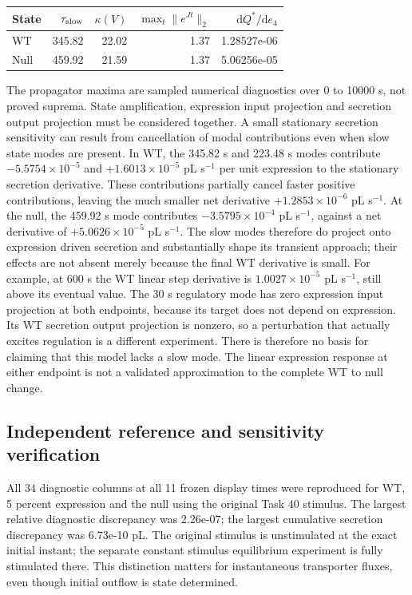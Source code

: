 \begin{center}\begin{tabular}{lrrrr}\hline State & $\tau_{\rm slow}$ & $\kappa(V)$ & $\max_t\|e^{Jt}\|_2$ & $\mathrm{d}Q^*/\mathrm{d}e_4$\\\hline

WT & 345.82 & 22.02 & 1.37 & 1.28527e-06\\

Null & 459.92 & 21.59 & 1.37 & 5.06256e-05\\

\hline\end{tabular}\end{center}

The propagator maxima are sampled numerical diagnostics over 0 to 10000 s, not proved suprema. State amplification, expression input projection and secretion output projection must be considered together. A small stationary secretion sensitivity can result from cancellation of modal contributions even when slow state modes are present. In WT, the 345.82 s and 223.48 s modes contribute $-5.5754\times10^{-5}$ and $+1.6013\times10^{-5}$ pL s$^{-1}$ per unit expression to the stationary secretion derivative. These contributions partially cancel faster positive contributions, leaving the much smaller net derivative $+1.2853\times10^{-6}$ pL s$^{-1}$. At the null, the 459.92 s mode contributes $-3.5795\times10^{-4}$ pL s$^{-1}$, against a net derivative of $+5.0626\times10^{-5}$ pL s$^{-1}$. The slow modes therefore do project onto expression driven secretion and substantially shape its transient approach; their effects are not absent merely because the final WT derivative is small. For example, at 600 s the WT linear step derivative is $1.0027\times10^{-5}$ pL s$^{-1}$, still above its eventual value. The 30 s regulatory mode has zero expression input projection at both endpoints, because its target does not depend on expression. Its WT secretion output projection is nonzero, so a perturbation that actually excites regulation is a different experiment. There is therefore no basis for claiming that this model lacks a slow mode. The linear expression response at either endpoint is not a validated approximation to the complete WT to null change.

\subsection{Independent reference and sensitivity verification}

All 34 diagnostic columns at all 11 frozen display times were reproduced for WT, 5 percent expression and the null using the original Task 40 stimulus. The largest relative diagnostic discrepancy was 2.26e-07; the largest cumulative secretion discrepancy was 6.73e-10 pL. The original stimulus is unstimulated at the exact initial instant; the separate constant stimulus equilibrium experiment is fully stimulated there. This distinction matters for instantaneous transporter fluxes, even though initial outflow is state determined.

